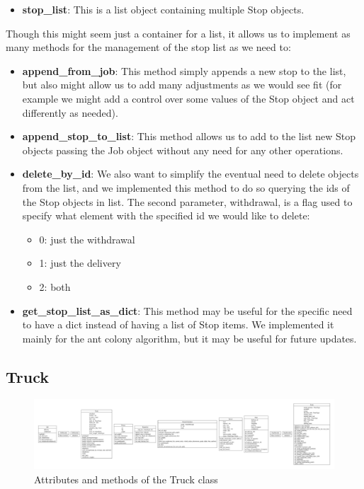\documentclass[titlepage]{article}
\begin{document}
\begin{itemize}
    \item \textbf{stop\_list}: This is a list object containing multiple Stop objects.
\end{itemize}

Though this might seem just a container for a list, it allows us to implement as many methods for the management of the stop list as we need to:

\begin{itemize}
    \item \textbf{append\_from\_job}: This method simply appends a new stop to the list, but also might allow us to add many adjustments as we would see fit (for example we might add a control over some values of the Stop object and act differently as needed).
    \item \textbf{append\_stop\_to\_list}: This method allows us to add to the list new Stop objects passing the Job object without any need for any other operations.
    \item \textbf{delete\_by\_id}: We also want to simplify the eventual need to delete objects from the list, and we implemented this method to do so querying the ids of the Stop objects in list. The second parameter, withdrawal, is a flag used to specify what element with the specified id we would like to delete:
    \begin{itemize}
        \item 0: just the withdrawal
        \item 1: just the delivery
        \item 2: both
    \end{itemize}
    \item \textbf{get\_stop\_list\_as\_dict}: This method may be useful for the specific need to have a dict instead of having a list of Stop items. We implemented it mainly for the ant colony algorithm, but it may be useful for future updates.
\end{itemize}

\subsection{Truck}
\begin{figure}[H]
    \centering
    \includegraphics[trim={85cm 1cm 0 1cm}, clip, scale=.5]{img/classes.pdf}
    \caption{Attributes and methods of the Truck class}
    \label{fig:truck_class}
\end{figure}
\end{document}
